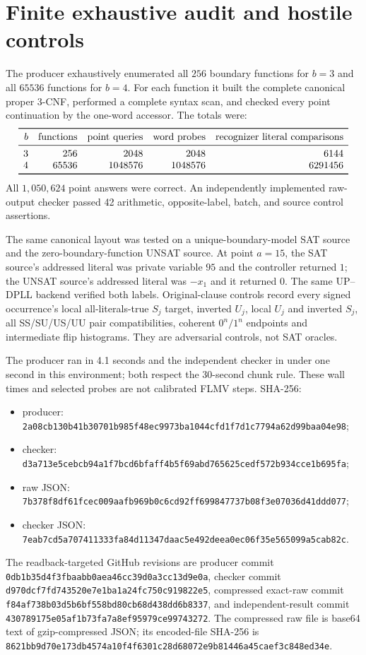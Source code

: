 \documentclass[11pt]{article}
\begin{document}
\section{Finite exhaustive audit and hostile controls}
The producer exhaustively enumerated all $256$ boundary functions for $b=3$
and all $65536$ functions for $b=4$.  For each function it built the complete
canonical proper 3-CNF, performed a complete syntax scan, and checked every
point continuation by the one-word accessor.  The totals were:
\[
\begin{array}{rrrrr}
\toprule
b&\text{functions}&\text{point queries}&\text{word probes}&
\text{recognizer literal comparisons}\\
\midrule
3&256&2048&2048&6144\\
4&65536&1048576&1048576&6291456\\
\bottomrule
\end{array}
\]
All $1{,}050{,}624$ point answers were correct.  An independently implemented
raw-output checker passed 42 arithmetic, opposite-label, batch, and source
control assertions.

The same canonical layout was tested on a unique-boundary-model SAT source and
the zero-boundary-function UNSAT source.  At point $a=15$, the SAT source's
addressed literal was private variable $95$ and the controller returned $1$;
the UNSAT source's addressed literal was $-x_1$ and it returned $0$.  The same
UP--DPLL backend verified both labels.  Original-clause controls record every
signed occurrence's local all-literals-true $S_j$ target, inverted $U_j$,
local $U_j$ and inverted $S_j$, all SS/SU/US/UU pair compatibilities, coherent
$0^n/1^n$ endpoints and intermediate flip histograms.  They are adversarial
controls, not SAT oracles.

The producer ran in 4.1 seconds and the independent checker in under one
second in this environment; both respect the 30-second chunk rule.  These
wall times and selected probes are not calibrated FLMV steps.  SHA-256:
\begin{itemize}
\item producer: \texttt{2a08cb130b41b30701b985f48ec9973ba1044cfd1f7d1c7794a62d99baa04e98};
\item checker: \texttt{d3a713e5cebcb94a1f7bcd6bfaff4b5f69abd765625cedf572b934cce1b695fa};
\item raw JSON: \texttt{7b378f8df61fcec009aafb969b0c6cd92ff699847737b08f3e07036d41ddd077};
\item checker JSON: \texttt{7eab7cd5a707411333fa84d11347daac5e492deea0ec06f35e565099a5cab82c}.
\end{itemize}
The readback-targeted GitHub revisions are producer commit
\texttt{0db1b35d4f3fbaabb0aea46cc39d0a3cc13d9e0a}, checker commit
\texttt{d970dcf7fd743520e7e1ba1a24fc750c919822e5}, compressed exact-raw commit
\texttt{f84af738b03d5b6bf558bd80cb68d438dd6b8337}, and independent-result commit
\texttt{430789175e05af1b73fa7a8ef95979ce99743272}.  The compressed raw file is
base64 text of gzip-compressed JSON; its encoded-file SHA-256 is
\texttt{8621bb9d70e173db4574a10f4f6301c28d68072e9b81446a45caef3c848ed34e}.
\end{document}
